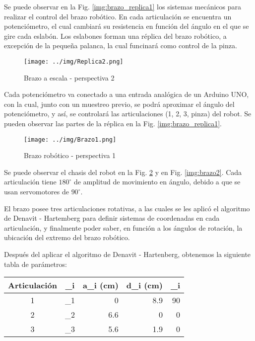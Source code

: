 \documentclass[gra_conf.tex]{subfiles}
\begin{document}
\begin{figure}[h]
\end{figure}

Se puede observar en la Fig. \ref{img:brazo_replica1} los sistemas mecánicos para realizar
el control del brazo robótico. En cada articulación se encuentra un 
potenciómetro, el cual cambiará su resistencia en función del ángulo
en el  que se gire cada eslabón. Los eslabones forman una réplica del
brazo robótico, a excepción de la pequeña palanca, la cual funcinará
como control de la pinza.

\begin{figure}[h]
  \centering
  \texttt{[image: ../img/Replica2.png]}
  \caption{Brazo a escala - perspectiva 2}
  \label{img:brazo_replica2}
\end{figure}

Cada potenciómetro va conectado a una entrada analógica de un Arduino UNO, 
con la cual, junto con un muestreo previo, se podrá aproximar el ángulo del 
potenciómetro, y así, se controlará las articulaciones (1, 2, 3, pinza) del 
robot. Se pueden observar las partes de la réplica en la Fig. \ref{img:brazo_replica1}.

\begin{figure}[h]
  \centering
  \texttt{[image: ../img/Brazo1.png]}
  \caption{Brazo robótico - perspectiva 1}
  \label{img:brazo1}
\end{figure}

Se puede observar el chasis del robot en la Fig. \ref{img:brazo1} y en Fig. \ref{img:brazo2}. Cada articulación
tiene $180^\circ$ de amplitud de movimiento en ángulo, debido a que se 
usan servomotores de $90^\circ$.

El brazo posee tres articulaciones rotativas, a las cuales se les aplicó el algoritmo de Denavit - Hartemberg para definir sistemas de coordenadas en cada articulación, y finalmente poder saber, en función a los ángulos de rotación, la ubicación del extremo del brazo robótico.

Después del aplicar el algoritmo de Denavit - Hartenberg, obtenemos la siguiente tabla de parámetros:


\begin{tabular}[t]{|c|c|r| r| r|}
	\hline
		Articulación & \theta_i & a_i (cm) & d_i (cm) & \alpha_i \\
           \hline
		1 & \theta_1 & 0 & 8.9 & 90\\
	\hline
		2 & \theta_2 & 6.6 & 0 & 0\\
	\hline
		3 & \theta_3 & 5.6 & 1.9 & 0\\
	\hline
\end{tabular}
\end{document}
